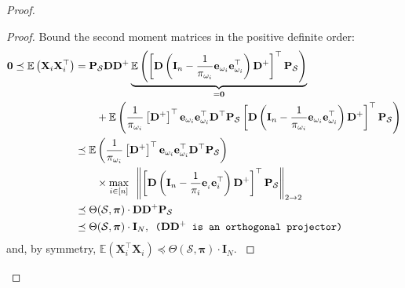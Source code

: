 \begin{proof}
\begin{proof}
{                Bound the second moment matrices in the positive definite order:
                \begin{align*}
                    \mathbf{0} \preceq \mathbb{E} \left ( \mathbf{X}_i \mathbf{X}_{i}^\top \right ) & = \mathbf{P}_\mathcal{S} \mathbf{D} \mathbf{D}^{+} \underbrace{\mathbb{E} \left ( \left [ \mathbf{D} \left ( \mathbf{I}_n - \frac{1}{\pi_{\omega_i}}\mathbf{e}_{\omega_i} \mathbf{e}_{\omega_i}^\top \right ) \mathbf{D}^{+} \right ]^\top \mathbf{P}_\mathcal{S} \right ) }_{= \mathbf{0}} \\
                    & \qquad + \mathbb{E} \left ( \frac{1}{\pi_{\omega_i}}\left [ \mathbf{D}^{+} \right ]^{\top} \mathbf{e}_{\omega_i} \mathbf{e}_{\omega_i}^\top \mathbf{D}^{\top}  \mathbf{P}_\mathcal{S} \left [ \mathbf{D} \left ( \mathbf{I}_n - \frac{1}{\pi_{\omega_i}}\mathbf{e}_{\omega_i} \mathbf{e}_{\omega_i}^\top \right ) \mathbf{D}^{+} \right ]^\top \mathbf{P}_\mathcal{S} \right ) \\
                    & \preceq \mathbb{E} \left ( \frac{1}{\pi_{\omega_i}}\left [ \mathbf{D}^{+} \right ]^{\top} \mathbf{e}_{\omega_i} \mathbf{e}_{\omega_i}^\top \mathbf{D}^{\top}  \mathbf{P}_\mathcal{S} \right ) \\
                    & \qquad \times \underset{i \in [n]}{\max} \enspace \left \| \left [ \mathbf{D} \left ( \mathbf{I}_n - \frac{1}{\pi_{i}}\mathbf{e}_{_i} \mathbf{e}_{i}^\top \right ) \mathbf{D}^{+} \right ]^\top \mathbf{P}_\mathcal{S} \right \|_{2 \to 2}\\
                    & \preceq \Theta (\mathcal{S}, \bm{\pi}) \cdot \mathbf{D} \mathbf{D}^{+} \mathbf{P}_\mathcal{S} \\
                    & \preceq \Theta (\mathcal{S}, \bm{\pi}) \cdot \mathbf{I}_N, \enspace \texttt{($\mathbf{D} \mathbf{D}^{+}$ is an orthogonal projector)}
                \end{align*}
                and, by symmetry, $\mathbb{E} \left ( \mathbf{X}_i^{\top} \mathbf{X}_{i} \right ) \preceq \Theta (\mathcal{S}, \bm{\pi}) \cdot \mathbf{I}_N$.
            }
            \qedsymbol
        \end{proof}


\end{proof}
